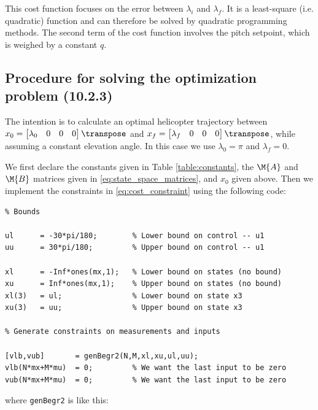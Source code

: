 This cost function focuses on the error between $\lambda_i$ and $\lambda_f$.
It is a least-square (i.e. quadratic) function and can therefore be solved by quadratic programming methods.
The second term of the cost function involves the pitch setpoint, which is weighed by a constant $q$.


\subsection{Procedure for solving the optimization problem (10.2.3)}
\label{optimalProcedure}

The intention is to calculate an optimal helicopter trajectory between $x_0 = \begin{bmatrix} \lambda_0 & 0 & 0 & 0 \end{bmatrix} \transpose$ and $x_f = \begin{bmatrix} \lambda_f & 0 & 0 & 0 \end{bmatrix} \transpose$, while assuming a constant elevation angle. In this case we use $\lambda_0 = \pi$ and $\lambda_f = 0$.

We first declare the constants given in Table \ref{table:constants}, the $\M{A}$ and $\M{B}$ matrices given in \eqref{eq:state_space_matrices}, and $x_0$ given above. Then we implement the constraints in \eqref{eq:cost_constraint} using the following code:

\begin{lstlisting}
% Bounds

ul 	    = -30*pi/180;        % Lower bound on control -- u1
uu 	    = 30*pi/180;         % Upper bound on control -- u1

xl      = -Inf*ones(mx,1);   % Lower bound on states (no bound)
xu      = Inf*ones(mx,1);    % Upper bound on states (no bound)
xl(3)   = ul;                % Lower bound on state x3
xu(3)   = uu;                % Upper bound on state x3

% Generate constraints on measurements and inputs

[vlb,vub]       = genBegr2(N,M,xl,xu,ul,uu);
vlb(N*mx+M*mu)  = 0;         % We want the last input to be zero
vub(N*mx+M*mu)  = 0;         % We want the last input to be zero

\end{lstlisting}
where \texttt{genBegr2} is like this:

